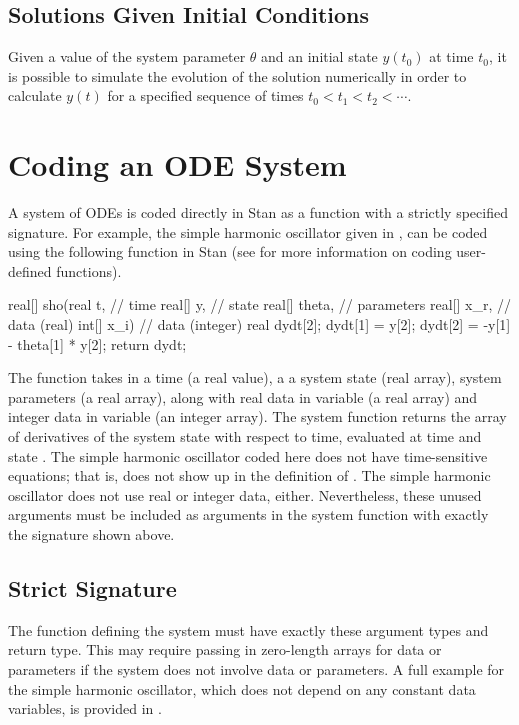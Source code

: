 \subsection{Solutions Given Initial Conditions}

Given a value of the system parameter $\theta$ and an initial state
$y(t_0)$ at time $t_0$, it is possible to simulate the evolution of
the solution numerically in order to calculate $y(t)$ for a specified
sequence of times $t_0 < t_1 < t_2 < \cdots$.

\section{Coding an ODE System}

A system of ODEs is coded directly in Stan as a function with a
strictly specified signature.  For example, the simple harmonic
oscillator given in , can be coded using the
following function in Stan (see  for
more information on coding user-defined functions).
%
\begin{stancode}
real[] sho(real t,        // time
           real[] y,      // state
           real[] theta,  // parameters
           real[] x_r,    // data (real)
           int[] x_i) {   // data (integer)
  real dydt[2];
  dydt[1] = y[2];
  dydt[2] = -y[1] - theta[1] * y[2];
  return dydt;
}
\end{stancode}
%
The function takes in a time  (a real value), a a system state
 (real array), system parameters  (a real array),
along with real data in variable  (a real array) and
integer data in variable  (an integer array).  The system
function returns the array of derivatives of the system state with
respect to time, evaluated at time  and state .  The
simple harmonic oscillator coded here does not have time-sensitive
equations; that is,  does not show up in the definition of
.  The simple harmonic oscillator does not use real or
integer data, either.  Nevertheless, these unused arguments must be
included as arguments in the system function with exactly the
signature shown above.


\subsection{Strict Signature}

The function defining the system must have exactly these argument
types and return type.  This may require passing in zero-length arrays
for data or parameters if the system does not involve data or
parameters.  A full example for the simple harmonic oscillator, which
does not depend on any constant data variables, is provided in
.


